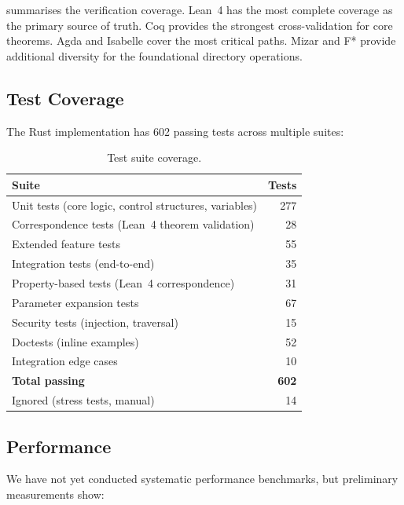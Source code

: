 \documentclass[11pt,a4paper]{article}
\newcommand{\lean}{Lean~4}
\begin{document}
 summarises the verification coverage. \lean{} has the most
complete coverage as the primary source of truth. Coq provides the strongest
cross-validation for core theorems. Agda and Isabelle cover the most critical
paths. Mizar and F* provide additional diversity for the foundational
directory operations.

\subsection{Test Coverage}

The Rust implementation has 602 passing tests across multiple suites:

\begin{table}[t]
\centering
\caption{Test suite coverage.}
\label{tab:tests}
\begin{tabular}{@{}lr@{}}
\toprule
\textbf{Suite} & \textbf{Tests} \\
\midrule
Unit tests (core logic, control structures, variables) & 277 \\
Correspondence tests (\lean{} theorem validation)       & 28 \\
Extended feature tests                                  & 55 \\
Integration tests (end-to-end)                          & 35 \\
Property-based tests (\lean{} correspondence)            & 31 \\
Parameter expansion tests                               & 67 \\
Security tests (injection, traversal)                   & 15 \\
Doctests (inline examples)                              & 52 \\
Integration edge cases                                  & 10 \\
\midrule
\textbf{Total passing}                                  & \textbf{602} \\
Ignored (stress tests, manual)                          & 14 \\
\bottomrule
\end{tabular}
\end{table}

\subsection{Performance}

We have not yet conducted systematic performance benchmarks, but preliminary
measurements show:
\end{document}
